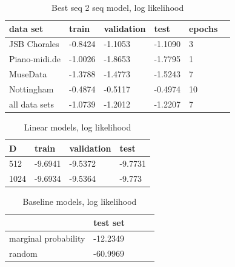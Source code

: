 \documentclass[12pt]{article}\pagestyle{myheadings}
\begin{document}

\begin{table}[]
\centering
\caption{Best seq 2 seq model, log likelihood}
\label{my-label}
\begin{tabular}{|l|l|l|l|l|l|}
\hline
data set    & train & validation & test & epochs\\ \hline
JSB Chorales &   -0.8424    &    -1.1053        &    -1.1090  &   3     \\ \hline
Piano-midi.de &   -1.0026    &    -1.8653        &    -1.7795  &   1     \\ \hline
MuseData &   -1.3788    &    -1.4773        &    -1.5243  &   7     \\ \hline
Nottingham &   -0.4874    &    -0.5117        &    -0.4974  &   10     \\ \hline
all data sets &   -1.0739    &    -1.2012        &    -1.2207  &   7     \\ \hline
\end{tabular}
\end{table}

\begin{table}[]
\centering
\caption{Linear models, log likelihood}
\label{my-label}
\begin{tabular}{|l|l|l|l|}
\hline
D   & train & validation & test \\ \hline
512 & -9.6941 & -9.5372 & -9.7731  \\ \hline
1024 & -9.6934 & -9.5364 & -9.773  \\ \hline
\end{tabular}
\end{table}



\begin{table}[]
\centering
\caption{Baseline models, log likelihood }
\label{my-label}
\begin{tabular}{|l|l|l|l|l|}
\hline
        &  test set \\ \hline
marginal probability &-12.2349 \\ \hline
random & -60.9969 \\ \hline
\end{tabular}
\end{table}  


\newpage

 
\end{document}
